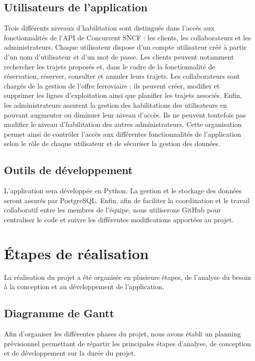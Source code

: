 \documentclass[12pt,a4paper]{report}
\begin{document}
\subsection*{Utilisateurs de l'application}

Trois différents niveaux d’habilitation sont distingués dans l’accès aux fonctionnalités de l’API de Concurrent SNCF : les clients, les collaborateurs et les administrateurs. Chaque utilisateur dispose d’un compte utilisateur créé à partir d’un nom d’utilisateur et d’un mot de passe. Les clients peuvent notamment rechercher les trajets proposés et, dans le cadre de la fonctionnalité de réservation, réserver, consulter et annuler leurs trajets. Les collaborateurs sont chargés de la gestion de l’offre ferroviaire : ils peuvent créer, modifier et supprimer les lignes d’exploitation ainsi que planifier les trajets associés. Enfin, les administrateurs assurent la gestion des habilitations des utilisateurs en pouvant augmenter ou diminuer leur niveau d’accès. Ils ne peuvent toutefois pas modifier le niveau d’habilitation des autres administrateurs. Cette organisation permet ainsi de contrôler l’accès aux différentes fonctionnalités de l’application selon le rôle de chaque utilisateur et de sécuriser la gestion des données.


\subsection*{Outils de développement}

L’application sera développée en Python. La gestion et le stockage des données seront assurés par PostgreSQL. Enfin, afin de faciliter la coordination et le travail collaboratif entre les membres de l’équipe, nous utiliserons GitHub pour centraliser le code et suivre les différentes modifications apportées au projet.


\section{Étapes de réalisation}

La réalisation du projet a été organisée en plusieurs étapes,
de l'analyse du besoin à la conception et au développement de
l'application.

\subsection{Diagramme de Gantt}

Afin d'organiser les différentes phases du projet, nous avons établi
un planning prévisionnel permettant de répartir les principales étapes
d'analyse, de conception et de développement sur la durée du projet.
\end{document}
